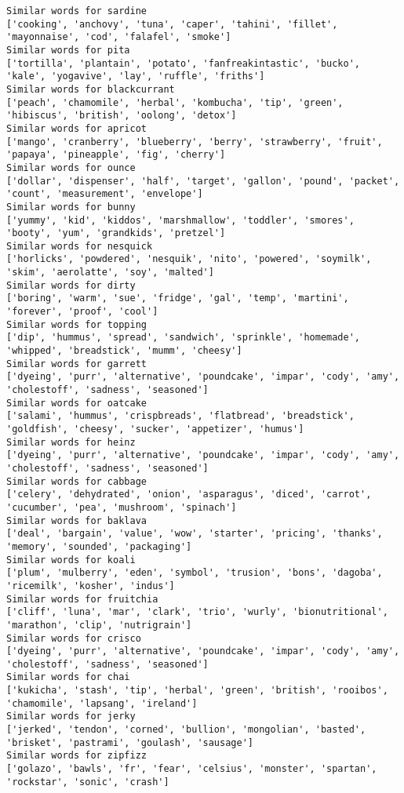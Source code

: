 \documentclass[11pt]{article}
\begin{document}
\begin{Verbatim}[commandchars=\\\{\}]
Similar words for sardine
['cooking', 'anchovy', 'tuna', 'caper', 'tahini', 'fillet', 'mayonnaise', 'cod', 'falafel', 'smoke']
Similar words for pita
['tortilla', 'plantain', 'potato', 'fanfreakintastic', 'bucko', 'kale', 'yogavive', 'lay', 'ruffle', 'friths']
Similar words for blackcurrant
['peach', 'chamomile', 'herbal', 'kombucha', 'tip', 'green', 'hibiscus', 'british', 'oolong', 'detox']
Similar words for apricot
['mango', 'cranberry', 'blueberry', 'berry', 'strawberry', 'fruit', 'papaya', 'pineapple', 'fig', 'cherry']
Similar words for ounce
['dollar', 'dispenser', 'half', 'target', 'gallon', 'pound', 'packet', 'count', 'measurement', 'envelope']
Similar words for bunny
['yummy', 'kid', 'kiddos', 'marshmallow', 'toddler', 'smores', 'booty', 'yum', 'grandkids', 'pretzel']
Similar words for nesquick
['horlicks', 'powdered', 'nesquik', 'nito', 'powered', 'soymilk', 'skim', 'aerolatte', 'soy', 'malted']
Similar words for dirty
['boring', 'warm', 'sue', 'fridge', 'gal', 'temp', 'martini', 'forever', 'proof', 'cool']
Similar words for topping
['dip', 'hummus', 'spread', 'sandwich', 'sprinkle', 'homemade', 'whipped', 'breadstick', 'mumm', 'cheesy']
Similar words for garrett
['dyeing', 'purr', 'alternative', 'poundcake', 'impar', 'cody', 'amy', 'cholestoff', 'sadness', 'seasoned']
Similar words for oatcake
['salami', 'hummus', 'crispbreads', 'flatbread', 'breadstick', 'goldfish', 'cheesy', 'sucker', 'appetizer', 'humus']
Similar words for heinz
['dyeing', 'purr', 'alternative', 'poundcake', 'impar', 'cody', 'amy', 'cholestoff', 'sadness', 'seasoned']
Similar words for cabbage
['celery', 'dehydrated', 'onion', 'asparagus', 'diced', 'carrot', 'cucumber', 'pea', 'mushroom', 'spinach']
Similar words for baklava
['deal', 'bargain', 'value', 'wow', 'starter', 'pricing', 'thanks', 'memory', 'sounded', 'packaging']
Similar words for koali
['plum', 'mulberry', 'eden', 'symbol', 'trusion', 'bons', 'dagoba', 'ricemilk', 'kosher', 'indus']
Similar words for fruitchia
['cliff', 'luna', 'mar', 'clark', 'trio', 'wurly', 'bionutritional', 'marathon', 'clip', 'nutrigrain']
Similar words for crisco
['dyeing', 'purr', 'alternative', 'poundcake', 'impar', 'cody', 'amy', 'cholestoff', 'sadness', 'seasoned']
Similar words for chai
['kukicha', 'stash', 'tip', 'herbal', 'green', 'british', 'rooibos', 'chamomile', 'lapsang', 'ireland']
Similar words for jerky
['jerked', 'tendon', 'corned', 'bullion', 'mongolian', 'basted', 'brisket', 'pastrami', 'goulash', 'sausage']
Similar words for zipfizz
['golazo', 'bawls', 'fr', 'fear', 'celsius', 'monster', 'spartan', 'rockstar', 'sonic', 'crash']

\end{Verbatim}
\end{document}
